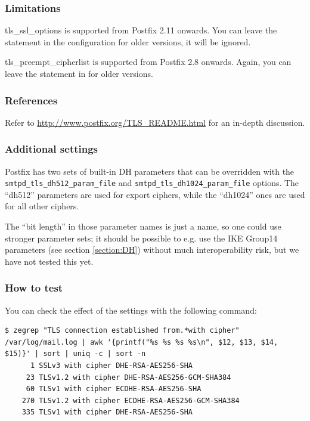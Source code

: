 \subsubsection{Limitations}
tls\_ssl\_options is supported from Postfix 2.11 onwards. You can
leave the statement in the configuration for older versions, it will
be ignored.

tls\_preempt\_cipherlist is supported from Postfix 2.8 onwards. Again,
you can leave the statement in for older versions.

\subsubsection{References}
Refer to \url{http://www.postfix.org/TLS_README.html} for an in-depth
discussion.

\subsubsection{Additional settings}
Postfix has two sets of built-in DH parameters that can be overridden
with the \verb|smtpd_tls_dh512_param_file|
and \verb|smtpd_tls_dh1024_param_file| options. The ``dh512''
parameters are used for export ciphers, while the ``dh1024'' ones are
used for all other ciphers.

The ``bit length'' in those parameter names is just a name, so one
could use stronger parameter sets; it should be possible to e.g. use the
IKE Group14 parameters (see section \ref{section:DH}) without much
interoperability risk, but we have not tested this yet.



\subsubsection{How to test}
You can check the effect of the settings with the following command:
\begin{lstlisting}
$ zegrep "TLS connection established from.*with cipher" /var/log/mail.log | awk '{printf("%s %s %s %s\n", $12, $13, $14, $15)}' | sort | uniq -c | sort -n
      1 SSLv3 with cipher DHE-RSA-AES256-SHA
     23 TLSv1.2 with cipher DHE-RSA-AES256-GCM-SHA384
     60 TLSv1 with cipher ECDHE-RSA-AES256-SHA
    270 TLSv1.2 with cipher ECDHE-RSA-AES256-GCM-SHA384
    335 TLSv1 with cipher DHE-RSA-AES256-SHA
\end{lstlisting}

